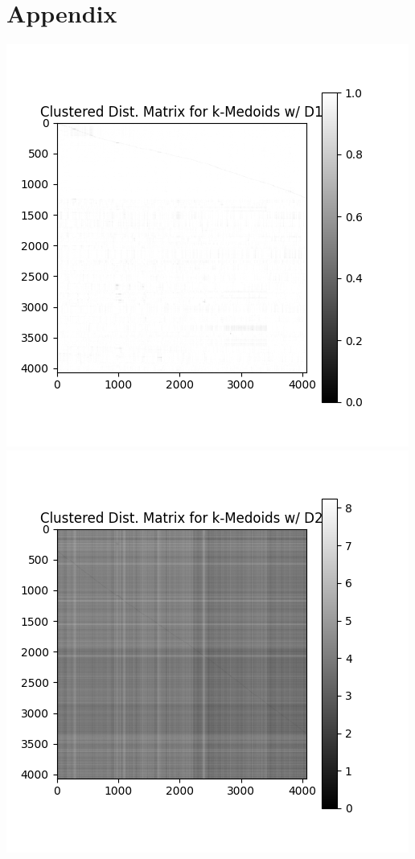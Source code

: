 \documentclass[fleqn]{article}
\begin{document}
\section*{Appendix}
\includegraphics[scale=1]{images/dist_matrix_km_d1.png}\\
\includegraphics[scale=1]{images/dist_matrix_km_d2.png}\\
\end{document}
